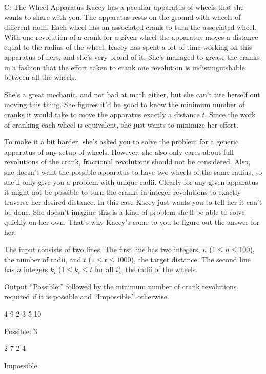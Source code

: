 \begin{problem}{C: The Wheel Apparatus}
Kacey has a peculiar apparatus of wheels that she wants to share with you.
The apparatus rests on the ground with wheels of different radii.
Each wheel has an associated crank to turn the associated wheel.
With one revolution of a crank for a given wheel the apparatus moves a distance equal to the radius of the wheel.
Kacey has spent a lot of time working on this apparatus of hers, and she's very proud of it.
She's managed to grease the cranks in a fashion that the effort taken to crank one revolution is indistinguishable between all the wheels.

She's a great mechanic, and not bad at math either, but she can't tire herself out moving this thing.
She figures it'd be good to know the minimum number of cranks it would take to move the apparatus exactly a distance $t$.
Since the work of cranking each wheel is equivalent, she just wants to minimize her effort.

To make it a bit harder, she's asked you to solve the problem for a generic apparatus of any setup of wheels.
However, she also only cares about full revolutions of the crank, fractional revolutions should not be considered.
Also, she doesn't want the possible apparatus to have two wheels of the same radius, so she'll only give you a problem with unique radii.
Clearly for any given apparatus it might not be possible to turn the cranks in integer revolutions to exactly traverse her desired distance.
In this case Kacey just wants you to tell her it can't be done.
She doesn't imagine this is a kind of problem she'll be able to solve quickly on her own.
That's why Kacey's come to you to figure out the answer for her.
\end{problem}

\begin{formalin}
The input consists of two lines.
The first line has two integers, $n$ ($1 \leq n \leq 100$), the number of radii, and $t$ ($1 \leq t \leq 1000$), the target distance.
The second line has $n$ integers $k_i$ ($1 \leq k_i \leq t$ for all $i$), the radii of the wheels.
\end{formalin}

\begin{formalout}
Output ``Possible:'' followed by the minimum number of crank revolutions required if it is possible and ``Impossible.'' otherwise.
\end{formalout}

\begin{datain}
4 9
2 3 5 10
\end{datain}
\begin{dataout}
Possible: 3
\end{dataout}

\begin{datain}
2 7
2 4
\end{datain}
\begin{dataout}
Impossible.
\end{dataout}
